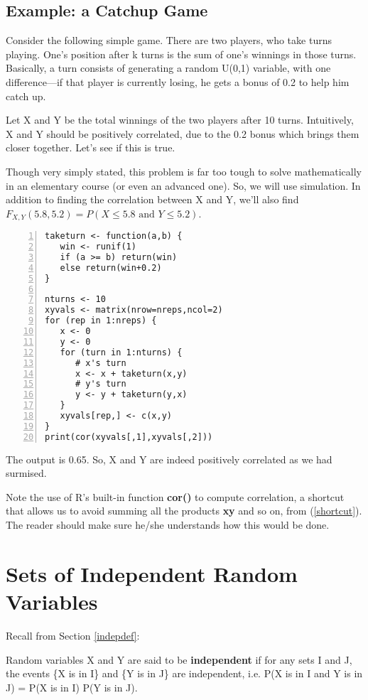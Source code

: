 \subsection{Example:  a Catchup Game}
\label{catchupgame}

Consider the following simple game.  There are two players, who take
turns playing.  One's position after k turns is the sum of one's
winnings in those turns.  Basically, a turn consists of generating a
random U(0,1) variable, with one difference---if that player is
currently losing, he gets a bonus of 0.2 to help him catch up.  

Let X and Y be the total winnings of the two players after 10 turns.
Intuitively, X and Y should be positively correlated, due to the 0.2
bonus which brings them closer together.  Let's see if this is true.

Though very simply stated, this problem is far too tough to solve
mathematically in an elementary course (or even an advanced one).  So,
we will use simulation.  In addition to finding the correlation between
X and Y, we'll also find $F_{X,Y}(5.8,5.2) = 
P(X \leq 5.8 \textrm{ and } Y \leq 5.2)$. 

\begin{Verbatim}[fontsize=\relsize{-2},numbers=left]
taketurn <- function(a,b) {
   win <- runif(1)
   if (a >= b) return(win)
   else return(win+0.2)
}

nturns <- 10
xyvals <- matrix(nrow=nreps,ncol=2)
for (rep in 1:nreps) {
   x <- 0
   y <- 0
   for (turn in 1:nturns) {
      # x's turn
      x <- x + taketurn(x,y)
      # y's turn
      y <- y + taketurn(y,x)
   }
   xyvals[rep,] <- c(x,y)
}
print(cor(xyvals[,1],xyvals[,2]))
\end{Verbatim}

The output is 0.65.  So, X and Y are indeed positively correlated as we
had surmised.

Note the use of R's built-in function {\bf cor()} to compute
correlation, a shortcut that allows us to avoid summing all the products
{\bf xy} and so on, from (\ref{shortcut}).  The reader should make sure
he/she understands how this would be done.

\section{Sets of Independent Random Variables}

Recall from Section \ref{indepdef}:

\begin{definition}

Random variables X and Y are said to be {\bf independent} if for any
sets I and J, the events \{X is in I\} and \{Y is in J\} are 
independent, i.e.  P(X is in I and Y is in J) = P(X is in I) P(Y is in
J). 

\end{definition}

